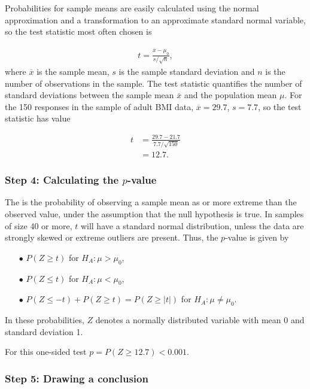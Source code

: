 \begin{spacing}{1.5}
Probabilities for sample means are easily calculated using the normal approximation and a transformation to an approximate standard normal variable, so the test statistic most often chosen is 

\begin{align*}
t=\frac{\overline{x}-\mu_0}{s/\sqrt{n}},
\end{align*}
where $\overline{x}$ is the sample mean, $s$ is the sample standard deviation and $n$ is the number of observations in the sample. The test statistic quantifies the number of standard deviations between the sample mean $\overline{x}$ and the population mean $\mu$.  For the 150 responses in the sample of adult BMI data, $\overline{x} = 29.7$, $s = 7.7$, so the test statistic has value

\begin{align*}
t &= \frac{29.7 - 21.7}{7.7/\sqrt{150}} \\
  &= 12.7.
\end{align*}

\subsubsection{Step 4: Calculating the $p$-value}

The  is the probability of observing a sample mean as or more extreme than the observed value, under the assumption that the null hypothesis is true. In samples of size 40 or more, $t$ will have a standard normal distribution, unless the data are strongly skewed or extreme outliers are present. Thus, the $p$-value is given by

\begin{itemize}
	\item[$\bullet$] $P(Z \geq t)$ for $H_A: \mu > \mu_0$,
	
	\item[$\bullet$] $P(Z \leq t)$ for $H_A: \mu < \mu_0$,
	
	\item[$\bullet$] $P(Z \leq -t) + P(Z \geq t) = P(Z \geq |t| )$ for $H_A: \mu \neq \mu_0.$
\end{itemize}
In these probabilities, $Z$ denotes a normally distributed variable with mean 0 and standard deviation 1.

For this one-sided test $ p = P(Z \geq 12.7) < 0.001$.

\subsubsection{Step 5: Drawing a conclusion}


\end{spacing}
